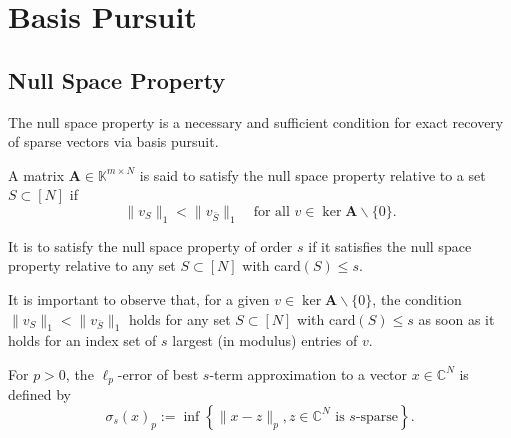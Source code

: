 \section{Basis Pursuit}

\subsection{Null Space Property}

The null space property is a necessary and sufficient condition for exact recovery of sparse vectors via basis pursuit. 

\begin{definition}
    \label{def0.4.1}
    A matrix $\mathbf{A} \in \mathbb{K}^{m \times N}$ is said to satisfy the \textcolor[rgb]{1,0,0}{null space property} relative to a set $S \subset [N]$ if 
    \begin{equation}
        \|v_S\|_1 < \|v_{\bar{S}}\|_1 \quad \text{for all } v \in \mathop{\mathrm{ker}}\mathbf{A} \backslash \{0\}.
        \label{eq0.4.1}
    \end{equation}
\end{definition}

It is to satisfy the null space property of order $s$ if it satisfies the null space property relative to any set $S \subset [N]$ with card$(S) \leq s$.

\begin{remark}
    \label{rmk0.4.2}
    It is important to observe that, for a given $v \in \mathop{\mathrm{ker}}\mathbf{A} \backslash \{0\}$, the condition $\|v_S\|_1 < \|v_{\bar{S}}\|_1$ holds for any set $S \subset [N]$ with card$(S) \leq s$ as soon as it holds for an index set of $s$ largest (in modulus) entries of $v$.
\end{remark}

\begin{mdframed}
    \begin{definition}
        \label{def2.2ofbook}
        For $p>0$, the $\ell_p$-error of best $s$-term approximation to a vector $x \in \mathbb{C}^{N}$ is defined by
        \[
            \sigma_s(x)_p := \inf \left\{ \|x-z\|_p, z \in \mathbb{C}^N \text{ is $s$-sparse} \right\}.
        \]
    \end{definition}
\end{mdframed}


